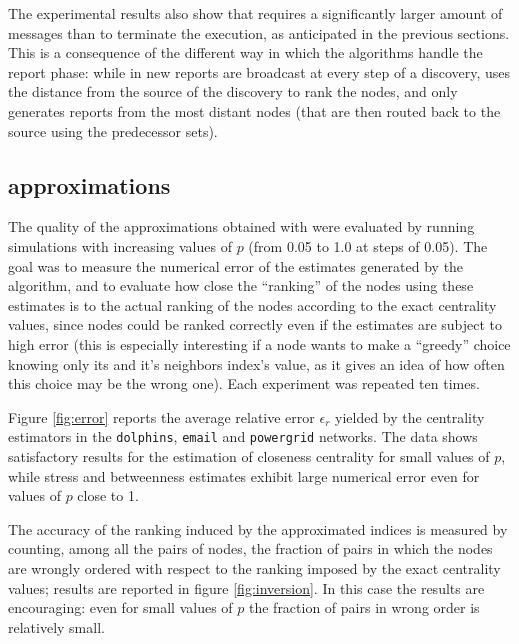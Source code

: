 The experimental results also show that \deccen{} requires a significantly larger amount of messages than \multibfs{} to terminate the execution, as anticipated in the previous sections. This is a consequence of the different way in which the algorithms handle the report phase: while in \deccen{} new reports are broadcast at every step of a discovery, \multibfs{} uses the distance from the source of the discovery to rank the nodes, and only generates reports from the most distant nodes (that are then routed back to the source using the predecessor sets).

\subsection{\multibfs{} approximations}

The quality of the approximations obtained with \multibfs{} were evaluated by running simulations with increasing values of $p$ (from 0.05 to 1.0 at steps of 0.05). The goal was to measure the numerical error of the estimates generated by the algorithm, and to evaluate how close the ``ranking'' of the nodes using these estimates is to the actual ranking of the nodes according to the exact centrality values, since nodes could be ranked correctly even if the estimates are subject to high error (this is especially interesting if a node wants to make a ``greedy'' choice knowing only its and it's neighbors index's value, as it gives an idea of how often this choice may be the wrong one). Each experiment was repeated ten times.

Figure \ref{fig:error} reports the average relative error $\epsilon_r$ yielded by the centrality estimators in the \texttt{dolphins}, \texttt{email} and \texttt{powergrid} networks. The data shows satisfactory results for the estimation of closeness centrality for small values of $p$, while stress and betweenness estimates exhibit large numerical error even for values of $p$ close to 1.



The accuracy of the ranking induced by the approximated indices is measured by counting, among all the pairs of nodes, the fraction of pairs in which the nodes are wrongly ordered with respect to the ranking imposed by the exact centrality values; results are reported in figure \ref{fig:inversion}. In this case the results are encouraging: even for small values of $p$ the fraction of pairs in wrong order is relatively small.


